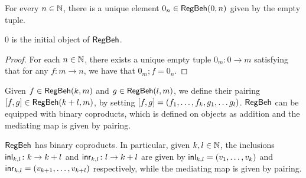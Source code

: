  For every $n \in \mathbb{N}$, there is a unique element $0_n \in \mathsf{RegBeh}(0,n)$ given by the empty tuple.
 \begin{lemma}
	$0$ is the initial object of $\mathsf{RegBeh}$.
\end{lemma}
\begin{proof}
For each $n \in \mathbb{N}$, there exists a unique empty tuple $0_m \colon 0 \to m$ satisfying that for any $f \colon m \to n$, we have that $0_m ; f = 0_n$.
\end{proof}
 Given $f \in \mathsf{RegBeh}(k,m)$ and $g \in \mathsf{RegBeh}(l,m)$, we define their pairing $[ f , g ] \in \mathsf{RegBeh} (k + l,m)$, by setting $[ f , g ] = (f_1, \dots, f_k, g_1, \dots g_l)$. $\mathsf{RegBeh}$ can be equipped with binary coproducts, which is defined on objects as addition and the mediating map is given by pairing.
\begin{lemma}
	$\mathsf{RegBeh}$ has binary coproducts. In particular, given $k, l \in \mathbb{N}$, the inclusions $\mathsf{inl}_{k,l} \colon k \to k +l$ and $\mathsf{inr}_{k,l} \colon l \to k + l$ are given by $\mathsf{inl}_{k,l} = (v_1, \dots, v_k)$ and $\mathsf{inr}_{k,l} = (v_{k+1}, \dots, v_{k+l})$ respectively, while the mediating map is given by pairing. 
\end{lemma}
